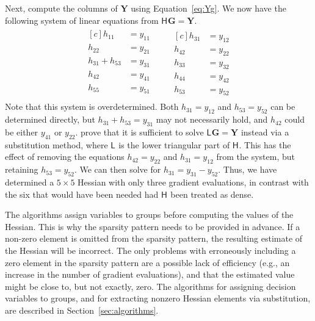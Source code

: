 \documentclass[jss]{jss}\usepackage[]{graphicx}\usepackage[]{color}
\newcommand{\hess}[2]{\mathsf{H}_{#1}#2}
\newcommand{\hessLT}[2]{\mathsf{L}_{#1}#2}
\newcommand{\Mat}[1]{\mathbf{#1}}
\begin{document}
Next, compute the columns of $\Mat{Y}$ using Equation~\ref{eq:Yg}.  We now
have the following system of linear equations from $\hess{}{}\Mat{G}=\Mat{Y}$.
\begin{align}
  \label{eq:11}
  \begin{aligned}[c]
  h_{11}&=y_{11}\\
  h_{22}&=y_{21}\\
  h_{31}+h_{53}&=y_{31}\\
  h_{42}&=y_{41}\\
  h_{55}&=y_{51}\\
  \end{aligned}
  \qquad
  \begin{aligned}[c]
  h_{31}&=y_{12}\\
  h_{42}&=y_{22}\\
  h_{33}&=y_{32}\\
  h_{44}&=y_{42}\\
  h_{53}&=y_{52}
  \end{aligned}
\end{align}
Note that this system is overdetermined.  Both $h_{31}=y_{12}$ and $h_{53}=y_{52}$
can be determined directly, but $h_{31}+h_{53}=y_{31}$ may not
necessarily hold, and $h_{42}$
could be either $y_{41}$ or $y_{22}$.   prove
that it is sufficient to solve $\hessLT{}{}\Mat{G}=\Mat{Y}$ instead
via a substitution method, where $\hessLT{}{}$ is the lower
triangular part of $\hess{}{}$.  This has the effect of removing the equations
$h_{42}=y_{22}$ and $h_{31}=y_{12}$ from the system, but retaining
$h_{53}=y_{52}$.  We can then solve for
$h_{31}=y_{31}-y_{52}$. Thus, we have determined a
$5\times 5$ Hessian with only three gradient evaluations, in
contrast with the six that would have been needed had $\hess{}{}$ been treated
as dense.

The  algorithms assign variables to groups
before computing the values of the Hessian.  This is why the sparsity
pattern needs to be provided in advance.  If a non-zero element is
omitted from the sparsity pattern, the resulting estimate of the
Hessian will be incorrect.  The only problems with erroneously including a zero
element in the sparsity pattern are a possible lack of efficiency
(e.g., an increase in the number of gradient evaluations), and that
the estimated value might be close to, but not exactly, zero. The
algorithms for assigning decision variables to groups, and for
extracting nonzero Hessian elements via substitution, are described in
Section~\ref{sec:algorithms}.
\end{document}

